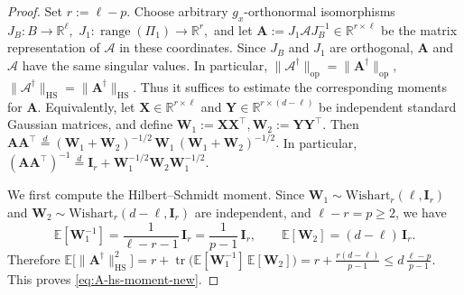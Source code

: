 \documentclass[final,onefignum,onetabnum]{siamart250211}
\begin{document}
\begin{proof}
  Set $r:=\ell-p$.
  Choose arbitrary $g_x$-orthonormal isomorphisms
  $
  J_B:B\to \mathbb R^\ell,
  $
  $
  J_1:\operatorname{range}(\Pi_1)\to \mathbb R^r,
  $
  and let
  $
  \mathbf{A}:=J_1\mathcal A J_B^{-1}\in \mathbb R^{r\times \ell}
  $
  be the matrix representation of $\mathcal A$ in these coordinates.
  Since $J_B$ and $J_1$ are orthogonal, $\mathbf{A}$ and $\mathcal A$ have the same singular values. In particular,
  $
  \|\mathcal A^{\dagger}\|_{\mathrm{op}}=\|\mathbf{A}^{\dagger}\|_{\mathrm{op}},
  $
  $
  \|\mathcal A^{\dagger}\|_{\mathrm{HS}}=\|\mathbf{A}^{\dagger}\|_{\mathrm{HS}}.
  $
  Thus it suffices to estimate the corresponding moments for $\mathbf{A}$.
  Equivalently, let
  $
  \mathbf{X}\in\mathbb R^{r\times \ell}
  $
  and
  $
  \mathbf{Y}\in\mathbb R^{r\times (d-\ell)}
  $
  be independent standard Gaussian matrices, and define
  $
  \mathbf{W}_1:=\mathbf{X}\mathbf{X}^\top,
  \mathbf{W}_2:=\mathbf{Y}\mathbf{Y}^\top.
  $
  Then
  $
  \mathbf{A}\mathbf{A}^\top
  \stackrel{d}{=}
  (\mathbf{W}_1+\mathbf{W}_2)^{-1/2}\,\mathbf{W}_1\,(\mathbf{W}_1+\mathbf{W}_2)^{-1/2}.
  $
  In particular,
  $
  (\mathbf{A}\mathbf{A}^\top)^{-1}
  \stackrel{d}{=}
  \mathbf{I}_r+\mathbf{W}_1^{-1/2}\mathbf{W}_2\mathbf{W}_1^{-1/2}.
  $

  We first compute the Hilbert--Schmidt moment.
  Since $\mathbf{W}_1\sim \mathrm{Wishart}_r(\ell,\mathbf{I}_r)$ and $\mathbf{W}_2\sim \mathrm{Wishart}_r(d-\ell,\mathbf{I}_r)$ are independent, and $\ell-r=p\ge 2$, we have
  \[
  \mathbb E[\mathbf{W}_1^{-1}]
  =
  \frac{1}{\ell-r-1}\,\mathbf{I}_r
  =
  \frac{1}{p-1}\,\mathbf{I}_r,
  \qquad
  \mathbb E[\mathbf{W}_2]
  =
  (d-\ell)\,\mathbf{I}_r.
  \]
  Therefore
  $
  \mathbb E \big[\|\mathbf{A}^{\dagger}\|_{\mathrm{HS}}^{2}\big]
  =
  r+\operatorname{tr}\!\big(\mathbb E[\mathbf{W}_1^{-1}]\,\mathbb E[\mathbf{W}_2]\big)
  =
  r+\frac{r(d-\ell)}{p-1}
  \le
  d\,\frac{\ell-p}{p-1}.
  $
  This proves \eqref{eq:A-hs-moment-new}.


\end{proof}
\end{document}

